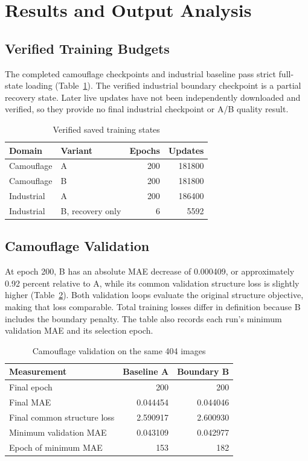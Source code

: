 \documentclass[conference,letterpaper]{IEEEtran}
\begin{document}
\section{Results and Output Analysis}
\subsection{Verified Training Budgets}
The completed camouflage checkpoints and industrial baseline pass strict full-state loading (Table~\ref{tab:budgets}). The verified industrial boundary checkpoint is a partial recovery state. Later live updates have not been independently downloaded and verified, so they provide no final industrial checkpoint or A/B quality result.

\begin{table}[!t]
\caption{Verified saved training states}
\label{tab:budgets}
\centering\footnotesize
\begin{tabular}{llrr}
\hline
Domain & Variant & Epochs & Updates\\
\hline
Camouflage & A & 200 & 181800\\
Camouflage & B & 200 & 181800\\
Industrial & A & 200 & 186400\\
Industrial & B, recovery only & 6 & 5592\\
\hline
\end{tabular}
\end{table}

\subsection{Camouflage Validation}
At epoch 200, B has an absolute MAE decrease of 0.000409, or approximately 0.92 percent relative to A, while its common validation structure loss is slightly higher (Table~\ref{tab:validation}). Both validation loops evaluate the original structure objective, making that loss comparable. Total training losses differ in definition because B includes the boundary penalty. The table also records each run's minimum validation MAE and its selection epoch.

\begin{table}[!t]
\caption{Camouflage validation on the same 404 images}
\label{tab:validation}
\centering\footnotesize
\begin{tabular}{lrr}
\hline
Measurement & Baseline A & Boundary B\\
\hline
Final epoch & 200 & 200\\
Final MAE & 0.044454 & 0.044046\\
Final common structure loss & 2.590917 & 2.600930\\
Minimum validation MAE & 0.043109 & 0.042977\\
Epoch of minimum MAE & 153 & 182\\
\hline
\end{tabular}
\end{table}
\end{document}

